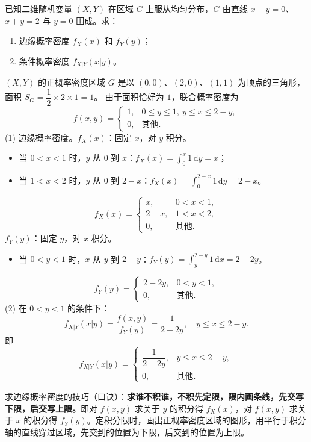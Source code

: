 \documentclass[lang=cn,11pt]{elegantbook}
\begin{document}
\begin{exercise}[三角形区域上的均匀分布] \label{exer:3-13}
已知二维随机变量 $(X,Y)$ 在区域 $G$ 上服从均匀分布，$G$ 由直线 $x-y=0$、$x+y=2$ 与 $y=0$ 围成。求：
\begin{enumerate}
    \item[(1)] 边缘概率密度 $f_X(x)$ 和 $f_Y(y)$；
    \item[(2)] 条件概率密度 $f_{X|Y}(x|y)$。
\end{enumerate}
\end{exercise}
\begin{solution}
$(X,Y)$ 的正概率密度区域 $G$ 是以 $(0,0)$、$(2,0)$、$(1,1)$ 为顶点的三角形，面积 $S_G = \dfrac{1}{2} \times 2 \times 1 = 1$。
由于面积恰好为 $1$，联合概率密度为
\[
f(x,y) = \begin{cases} 1, & 0 \leqslant y \leqslant 1,\ y \leqslant x \leqslant 2-y, \\ 0, & \text{其他}. \end{cases}
\]
(1) 边缘概率密度。$f_X(x)$：固定 $x$，对 $y$ 积分。
\begin{itemize}
    \item 当 $0 < x < 1$ 时，$y$ 从 $0$ 到 $x$：$f_X(x) = \displaystyle\int_0^x 1\,\mathrm{d}y = x$；
    \item 当 $1 < x < 2$ 时，$y$ 从 $0$ 到 $2-x$：$f_X(x) = \displaystyle\int_0^{2-x} 1\,\mathrm{d}y = 2-x$。
\end{itemize}
\[
f_X(x) = \begin{cases} x, & 0 < x < 1, \\ 2-x, & 1 < x < 2, \\ 0, & \text{其他}. \end{cases}
\]
$f_Y(y)$：固定 $y$，对 $x$ 积分。
\begin{itemize}
    \item 当 $0 < y < 1$ 时，$x$ 从 $y$ 到 $2-y$：$f_Y(y) = \displaystyle\int_y^{2-y} 1\,\mathrm{d}x = 2-2y$。
\end{itemize}
\[
f_Y(y) = \begin{cases} 2-2y, & 0 < y < 1, \\ 0, & \text{其他}. \end{cases}
\]
(2) 在 $0 < y < 1$ 的条件下：
\[
f_{X|Y}(x|y) = \frac{f(x,y)}{f_Y(y)} = \frac{1}{2-2y}, \quad y \leqslant x \leqslant 2-y.
\]
即
\[
f_{X|Y}(x|y) = \begin{cases} \dfrac{1}{2-2y}, & y \leqslant x \leqslant 2-y, \\ 0, & \text{其他}. \end{cases}
\]
\end{solution}
\begin{note}
求边缘概率密度的技巧（口诀）：\textbf{求谁不积谁，不积先定限，限内画条线，先交写下限，后交写上限。}即对 $f(x,y)$ 求关于 $y$ 的积分得 $f_X(x)$，对 $f(x,y)$ 求关于 $x$ 的积分得 $f_Y(y)$。定积分限时，画出正概率密度区域的图形，用平行于积分轴的直线穿过区域，先交到的位置为下限，后交到的位置为上限。
\end{note}
\end{document}
